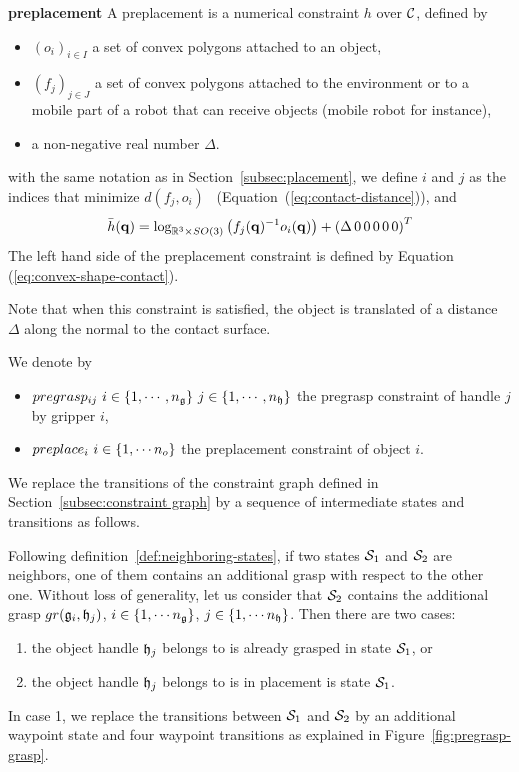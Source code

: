 \begin{definition}\label{def:preplacement}\textbf{preplacement}
  A preplacement is a numerical constraint $h$ over $\mathcal{C}$, defined by
  \begin{itemize}
  \item $(o_i)_{i\in I}$ a set of convex polygons attached to an object,
  \item $(f_j)_{j\in J}$ a set of convex polygons attached to the environment or to a mobile part of a robot that can receive objects (mobile robot for instance),
  \item a non-negative real number $\Delta$.
  \end{itemize}
  with the same notation as in Section~\ref{subsec:placement}, we define $i$ and
  $j$ as the indices that minimize $d(f_j,o_i)$~
  (Equation~(\ref{eq:contact-distance})), and
  \begin{equation}\label{eq:convex-shape-contact-hbar-preplacement}
    \bar{h}(\conf) = \log_{\reals^3\times SO(3)} \left(f_{j}(\conf)^{-1}o_i(\conf)\right) + \left(\Delta\,0\,0\,0\,0\,0\right)^T
  \end{equation}
  The left hand side of the preplacement constraint is defined by Equation~
  (\ref{eq:convex-shape-contact}).
\end{definition}
Note that when this constraint is satisfied, the object is translated of a
distance $\Delta$ along the normal to the contact surface.

We denote by
\begin{itemize}
\item $pregrasp_{ij}\ i\in\{1,\cdots,\ngrippers\}\ j\in\{1,\cdots,\nhandles\}$ the pregrasp constraint of handle $j$ by gripper $i$,
\item $preplace_{i}\ i\in\{1,\cdots\nobjects\}$ the preplacement constraint of object $i$.
\end{itemize}

We replace the transitions of the constraint graph defined in
Section~\ref{subsec:constraint graph} by a sequence of intermediate
states and transitions as follows.

Following definition~\ref{def:neighboring-states}, if two states $\mathcal{S}_1$
and $\mathcal{S}_2$ are neighbors, one of them contains an additional grasp with
respect to the other one. Without loss of generality, let us consider that
$\mathcal{S}_2$ contains the additional grasp $gr(\mathfrak{g}_i,\mathfrak{h}_j)$,
$i\in\{1,\cdots n_{\mathfrak{g}}\}$, $j\in\{1,\cdots n_{\mathfrak{h}}\}$. Then there are two
cases:
\begin{enumerate}
\item the object handle $\mathfrak{h}_j$ belongs to is already grasped in state
  $\mathcal{S}_1$, or
\item the object handle $\mathfrak{h}_j$ belongs to is in placement is
  state $\mathcal{S}_1$.
\end{enumerate}
In case 1, we replace the transitions between $\mathcal{S}_1$ and $\mathcal{S}_2$ by an additional waypoint state and four waypoint transitions as explained in Figure~\ref{fig:pregrasp-grasp}.

